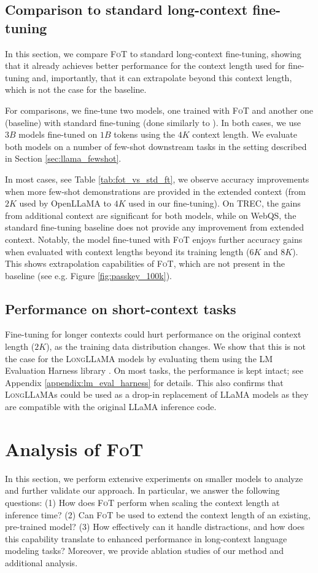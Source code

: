 \subsection{Comparison to standard long-context fine-tuning}

In this section, we compare \textsc{FoT} to standard long-context fine-tuning, showing that it already achieves better performance for the context length used for fine-tuning and, importantly, that it can extrapolate beyond this context length, which is not the case for the baseline.

For comparisons, we fine-tune two models, one trained with \textsc{FoT} and another one (baseline) with standard fine-tuning (done similarly to \citep{MosaicML2023Introducing, XGen}). In both cases, we use $3B$ models fine-tuned on $1B$ tokens using the $4K$ context length. We evaluate both models on a number of few-shot downstream tasks in the setting described in Section \ref{sec:llama_fewshot}. 

In most cases, see Table \ref{tab:fot_vs_std_ft}, we observe accuracy improvements when more few-shot demonstrations are provided in the extended context (from $2K$ used by OpenLLaMA to $4K$ used in our fine-tuning). On TREC, the gains from additional context are significant for both models, while on WebQS, the standard fine-tuning baseline does not provide any improvement from extended context. Notably, the model fine-tuned with \textsc{FoT} enjoys further accuracy gains when evaluated with context lengths beyond its training length ($6K$ and $8K$). This shows extrapolation capabilities of \textsc{FoT}, which are not present in the baseline (see e.g. Figure \ref{fig:passkey_100k}).

\subsection{Performance on short-context tasks} Fine-tuning for longer contexts could hurt performance on the original context length ($2K$), as the training data distribution changes. We show that this is not the case for the \textsc{LongLLaMA} models by evaluating them using the LM Evaluation Harness library \citep{eval-harness}. On most tasks, the performance is kept intact; see Appendix \ref{appendix:lm_eval_harness} for details. This also confirms that \textsc{LongLLaMA}s could be used as a drop-in replacement of LLaMA models as they are compatible with the original LLaMA inference code.

\section{ Analysis of \textsc{FoT}}
In this section, we perform extensive experiments on smaller models to analyze and further validate our approach. In particular, we answer the following questions: (1) How does \textsc{FoT} perform when scaling the context length at inference time? (2) Can \textsc{FoT} be used to extend the context length of an existing, pre-trained model? (3) How effectively can it handle distractions, and how does this capability translate to enhanced performance in long-context language modeling tasks?  Moreover, we provide ablation studies of our method and additional analysis.

